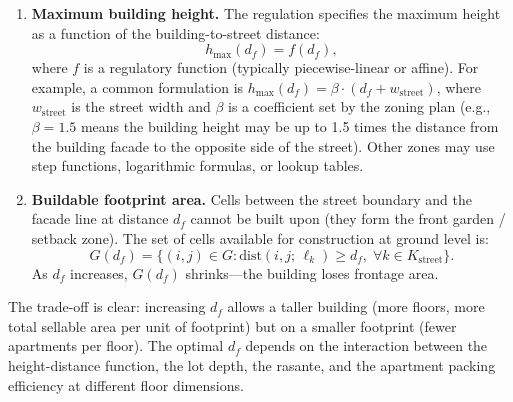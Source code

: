 \documentclass[11pt,a4paper]{article}
\begin{document}
\begin{enumerate}[label=(\roman*)]
    \item \textbf{Maximum building height.} The regulation specifies
    the maximum height as a function of the building-to-street distance:
    \begin{equation}\label{eq:height-vs-setback}
        h_{\max}(d_f) = f(d_f),
    \end{equation}
    where $f$ is a regulatory function (typically piecewise-linear or
    affine). For example, a common formulation is
    $h_{\max}(d_f) = \beta \cdot (d_f + w_{\text{street}})$,
    where $w_{\text{street}}$ is the street width and $\beta$ is a
    coefficient set by the zoning plan (e.g., $\beta = 1.5$ means the
    building height may be up to 1.5 times the distance from the
    building facade to the opposite side of the street). Other zones
    may use step functions, logarithmic formulas, or lookup tables.

    \item \textbf{Buildable footprint area.} Cells between the street
    boundary and the facade line at distance $d_f$ cannot be built upon
    (they form the front garden / setback zone). The set of cells
    available for construction at ground level is:
    \begin{equation}\label{eq:buildable-cells}
        G(d_f) = \bigl\{(i,j) \in G : \text{dist}(i,j;\,\ell_k) \geq d_f,\; \forall k \in K_{\text{street}}\bigr\}.
    \end{equation}
    As $d_f$ increases, $G(d_f)$ shrinks---the building loses frontage
    area.
\end{enumerate}

The trade-off is clear: increasing $d_f$ allows a taller building
(more floors, more total sellable area per unit of footprint) but on a
smaller footprint (fewer apartments per floor). The optimal $d_f$ depends
on the interaction between the height-distance function, the lot depth,
the rasante, and the apartment packing efficiency at different floor
dimensions.
\end{document}
